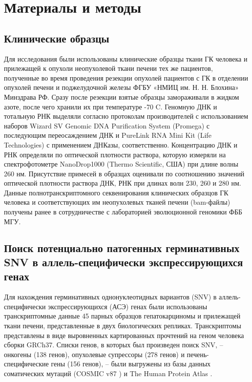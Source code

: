 \section{Материалы и методы}

\subsection{Клинические образцы}

Для исследования были использованы клинические образцы ткани ГК человека и прилежащей к опухоли неопухолевой ткани печени тех же пациентов, полученные во время проведения резекции опухолей пациентов с ГК в отделении опухолей печени и поджелудочной железы ФГБУ «НМИЦ им. Н. Н. Блохина» Минздрава РФ. Сразу после резекции взятые образцы замораживали в жидком азоте, после чего хранили их при температуре -70 \textdegree{}C. Геномную ДНК и тотальную РНК выделяли согласно протоколам производителей с использованием наборов Wizard SV Genomic DNA Purification System (Promega) с последующим переосаждением ДНК и PureLink RNA Mini Kit (Life Technologies) с применением ДНКазы, соответственно. Концентрацию ДНК и РНК определяли по оптической плотности раствора, которую измеряли на спектрофотометре NanoDrop1000 (Thermo Scientific, США) при длине волны 260 нм. Присутствие примесей в образцах оценивали по соотношению значений оптической плотности раствора ДНК, РНК при длинах волн 230, 260 и 280 нм. Данные полнотранскриптомного секвенирования клинических образцов ГК человека и соответствующих им неопухолевых тканей печени (bam-файлы) получены ранее в сотрудничестве с лабораторией эволюционной геномики ФББ МГУ.

\subsection{Поиск потенциально патогенных герминативных SNV в аллель-специфически экспрессирующихся генах}

Для нахождения герминативных однонуклеотидных вариантов (SNV) в аллель-специфически экспрессирующихся (АСЭ) генах были использованы транскриптомные данные 45 парных образцов гепатокарциномы и прилежащей ткани печени, представленные в двух биологических репликах. Транскриптомы представлены в виде выровненных картированных прочтений на геном человека сборки GRCh37. Списки генов, в которых был произведен поиск SNV, – онкогены (138 генов), опухолевые супрессоры (278 генов) и печень-специфические гены (156 генов), – были выгружены из базы данных соматических мутаций (COSMIC v87 \cite{forbes_cosmic:_2017}) и The Human Protein Atlas \cite{uhlen_pathology_2017}. 

